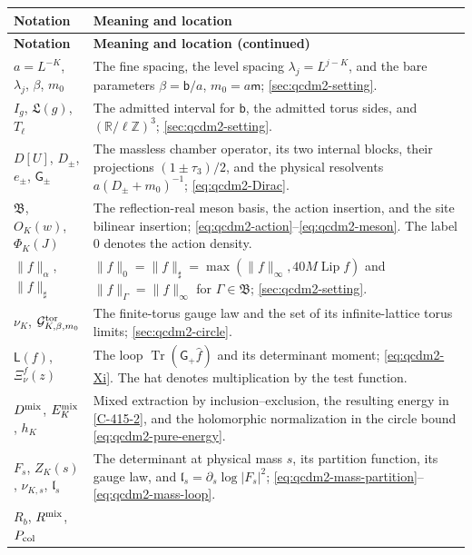 \documentclass[11pt,letterpaper,reqno]{amsart}
\theoremstyle{definition}
\theoremstyle{remark}
\begin{document}
\begingroup
\small
\renewcommand{\arraystretch}{1.1}
\begin{longtable}{@{}p{}@{\hspace{0.025\textwidth}}p{}@{}}
\textbf{Notation} & \textbf{Meaning and location}\\
\hline
\endfirsthead
\textbf{Notation} & \textbf{Meaning and location (continued)}\\
\hline
\endhead
\endfoot
\endlastfoot
$a=L^{-K}$, $\lambda_j$, $\beta$, $m_0$
& The fine spacing, the level spacing $\lambda_j=L^{j-K}$,
and the bare parameters $\beta=\mathsf b/a$, $m_0=a\mathsf m$;
\cref{sec:qcdm2-setting}.\\
$I_g$, $\mathfrak L(g)$, $T_\ell$
& The admitted interval for $\mathsf b$, the admitted torus
sides, and $(\mathbb R/\ell\mathbb Z)^3$;
\cref{sec:qcdm2-setting}.\\
$D[U]$, $D_\pm$, $e_\pm$, $\mathsf G_\pm$
& The massless chamber operator, its two internal blocks,
their projections $(1\pm\tau_3)/2$, and the physical
resolvents $a(D_\pm+m_0)^{-1}$;
\eqref{eq:qcdm2-Dirac}.\\
$\mathfrak B$, $O_K(w)$, $\Phi_K(J)$
& The reflection-real meson basis, the action insertion,
and the site bilinear insertion;
\eqref{eq:qcdm2-action}--\eqref{eq:qcdm2-meson}.
The label $0$ denotes the action density.\\
$\|f\|_\alpha$, $\|f\|_\sharp$
& $\|f\|_0=\|f\|_\sharp
=\max(\|f\|_\infty,40M\operatorname{Lip}f)$ and
$\|f\|_\Gamma=\|f\|_\infty$ for $\Gamma\in\mathfrak B$;
\cref{sec:qcdm2-setting}.\\
$\nu_K$, $\mathcal G^{\rm tor}_{K,\beta,m_0}$
& The finite-torus gauge law and the set of its infinite-lattice
torus limits; \cref{sec:qcdm2-circle}.\\
$\mathsf L(f)$, $\Xi_\nu^f(z)$
& The loop $\operatorname{Tr}(\mathsf G_+\hat f)$ and its
determinant moment; \eqref{eq:qcdm2-Xi}.
The hat denotes multiplication by the test function.\\
$D^{\rm mix}$, $E_K^{\rm mix}$, $h_K$
& Mixed extraction by inclusion--exclusion, the resulting
energy in \eqref{C-415-2}, and the holomorphic
normalization in the circle bound
\eqref{eq:qcdm2-pure-energy}.\\
$F_s$, $Z_K(s)$, $\nu_{K,s}$, $\mathfrak l_s$
& The determinant at physical mass $s$, its partition function,
its gauge law, and
$\mathfrak l_s=\partial_s\log|F_s|^2$;
\eqref{eq:qcdm2-mass-partition}--\eqref{eq:qcdm2-mass-loop}.\\
$R_b$, $R^{\rm mix}$, $P_{\rm col}$

\end{longtable}
\end{document}
